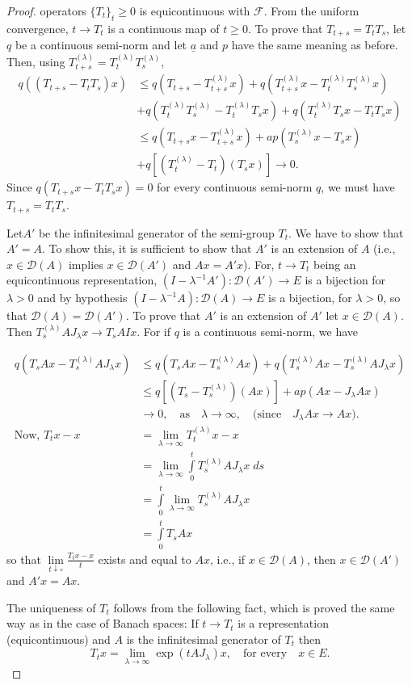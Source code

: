 \begin{proof}
operators $\{T_t\}_t\geq 0$ is equicontinuous with $\mathscr{F}$. From
the uniform convergence, $t\to T_t$ is a continuous map of $t\geq
0$. To prove that $T_{t+s}=T_t T_s$, let $q$ be a continuous semi-norm
and let $\underline{a}$ and $p$ have the same meaning as before. Then,
using $T_{t+s}^{(\lambda)}=T_t^{(\lambda)}T_s^{(\lambda)}$, 
\begin{align*}
q((T_{t+s}-T_t T_s)x) &\leq q(T_{t+s}-T_{t+s}^{(\lambda)}x)+q
(T_{t+s}^{(\lambda)}x-T_t^{(\lambda)}T_s^{(\lambda)}x)\\
&+ q(T_t^{(\lambda)} T_s^{(\lambda)}-T_t^{(\lambda)}T_sx)+q
(T_t^{(\lambda)}T_sx-T_t T_sx)\\
&\leq q(T_{t+s}x-T_{t+s}^{(\lambda)}x)+a p(T_s^{(\lambda)}x-T_s x)\\
&+q\left[ (T_t^{(\lambda)}-T_t)(T_sx)\right]\to 0. 
\end{align*}
Since $q(T_{t+s}x-T_t T_sx)=0$ for every continuous semi-norm $q$, we
must have $T_{t+s}=T_t T_s$. 

Let\pageoriginale $A'$ be the infinitesimal generator of the
semi-group $T_t$. We have to show that $A'=A$. To show this, it is
sufficient to show that $A'$ is an extension of $A$ (i.e., $x\in
\mathscr{D}(A)$ implies $x\in\mathscr{D}(A')$ and $Ax=A'x$). For,
$t\to T_t$ being an equicontinuous representation,
$(I-\lambda^{-1}A'): \mathscr{D}(A')\to E$ is a bijection for $\lambda
>0$ and by hypothesis $(I-\lambda^{-1}A):\mathscr{D}(A)\to E$ is a
bijection, for $\lambda >0$, so that
$\mathscr{D}(A)=\mathscr{D}(A')$. To prove that $A'$ is an extension
of $A'$ let $x\in\mathscr{D}(A)$. Then $T_s^{(\lambda)} A J_\lambda
x\to T_s A I x$. For if $q$ is a continuous semi-norm, we have 

\begin{align*}
q(T_s A x-T_s^{(\lambda)}AJ_\lambda x) & \leq q(T_s A
x-T_s^{(\lambda)}Ax)+q(T_s^{(\lambda)}A x-T_s^{(\lambda)}A J_\lambda
x)\\
&\leq q\left[(T_s-T_s^{(\lambda)})(Ax)\right]+a p(Ax-J_\lambda Ax)\\
& \to 0, \quad\text{as}\quad \lambda
 \to \infty, \quad \text{(since}
 \quad J_\lambda Ax\to Ax).\\
\text{Now, }  T_tx-x &= \lim\limits_{\lambda\to\infty}
T_t^{(\lambda)}x-x\\
&= \lim\limits_{\lambda\to\infty}\int\limits_0^t T_s^{(\lambda)} A
J_\lambda x \; ds\\
&= \int\limits_0^t \lim\limits_{\lambda\to\infty} T_s^{(\lambda)} A
J_\lambda x\\
&= \int\limits_0^t T_s Ax
\end{align*}
so that $\lim\limits_{t\downarrow \circ} \frac{T_tx-x}{t}$ exists and
equal to $Ax$, i.e., if $x\in\mathscr{D}(A)$, then $x\in\mathscr{D}
(A')$ and $A'x=Ax$.

The uniqueness of $T_t$ follows from the following fact, which is\break
proved the same way as in the case of Banach spaces: If $t\to T_t$ is
a representation (equicontinuous) and $A$ is the infinitesimal
generator of $T_t$ then 
$$
T_tx=\lim\limits_{\lambda\to\infty}\exp(t A J_\lambda)x, \quad
\text{for every}\quad x\in E.
$$
\end{proof}

